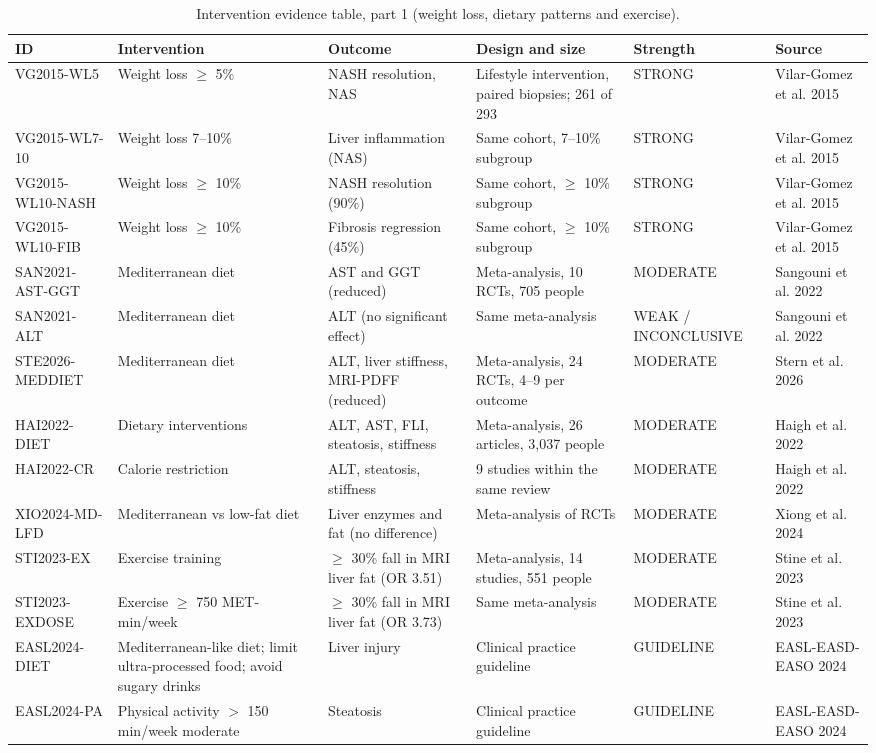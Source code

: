 \begin{table}[htbp]
\centering
\footnotesize
\caption{Intervention evidence table, part 1 (weight loss, dietary patterns and exercise).}
\label{tab:a_evidence1}
\begin{tabularx}{\textwidth}{>{\raggedright\arraybackslash}p{2.3cm}LLLp{1.95cm}L}
\toprule
ID & Intervention & Outcome & Design and size & Strength & Source \\
\midrule
VG2015-WL5 & Weight loss $\geq$ 5\% & NASH resolution, NAS & Lifestyle intervention, paired biopsies; 261 of 293 & STRONG & Vilar-Gomez et al. 2015 \\
VG2015-WL7-10 & Weight loss 7--10\% & Liver inflammation (NAS) & Same cohort, 7--10\% subgroup & STRONG & Vilar-Gomez et al. 2015 \\
VG2015-WL10-NASH & Weight loss $\geq$ 10\% & NASH resolution (90\%) & Same cohort, $\geq$ 10\% subgroup & STRONG & Vilar-Gomez et al. 2015 \\
VG2015-WL10-FIB & Weight loss $\geq$ 10\% & Fibrosis regression (45\%) & Same cohort, $\geq$ 10\% subgroup & STRONG & Vilar-Gomez et al. 2015 \\
SAN2021-AST-GGT & Mediterranean diet & AST and GGT (reduced) & Meta-analysis, 10 RCTs, 705 people & MODERATE & Sangouni et al. 2022 \\
SAN2021-ALT & Mediterranean diet & ALT (no significant effect) & Same meta-analysis & WEAK / INCON\-CLUSIVE & Sangouni et al. 2022 \\
STE2026-MEDDIET & Mediterranean diet & ALT, liver stiffness, MRI-PDFF (reduced) & Meta-analysis, 24 RCTs, 4--9 per outcome & MODERATE & Stern et al. 2026 \\
HAI2022-DIET & Dietary interventions & ALT, AST, FLI, steatosis, stiffness & Meta-analysis, 26 articles, 3,037 people & MODERATE & Haigh et al. 2022 \\
HAI2022-CR & Calorie restriction & ALT, steatosis, stiffness & 9 studies within the same review & MODERATE & Haigh et al. 2022 \\
XIO2024-MD-LFD & Mediterranean vs low-fat diet & Liver enzymes and fat (no difference) & Meta-analysis of RCTs & MODERATE & Xiong et al. 2024 \\
STI2023-EX & Exercise training & $\geq$ 30\% fall in MRI liver fat (OR 3.51) & Meta-analysis, 14 studies, 551 people & MODERATE & Stine et al. 2023 \\
STI2023-EXDOSE & Exercise $\geq$ 750 MET-min/week & $\geq$ 30\% fall in MRI liver fat (OR 3.73) & Same meta-analysis & MODERATE & Stine et al. 2023 \\
EASL2024-DIET & Mediterranean-like diet; limit ultra-processed food; avoid sugary drinks & Liver injury & Clinical practice guideline & GUIDELINE & EASL-EASD-EASO 2024 \\
EASL2024-PA & Physical activity $>$ 150 min/week moderate & Steatosis & Clinical practice guideline & GUIDELINE & EASL-EASD-EASO 2024 \\
\bottomrule
\end{tabularx}
\end{table}

